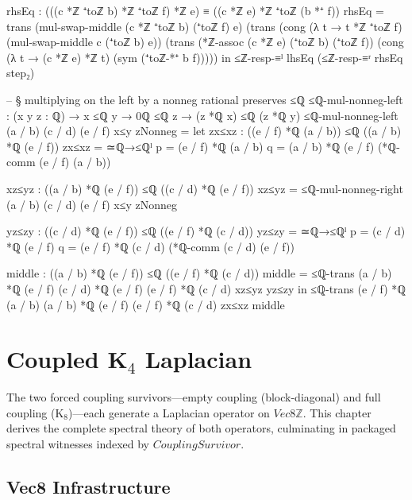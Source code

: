 \documentclass[11pt,a4paper]{book}
\def\texttt#1{#1}%
\begin{document}
\begin{code}
    rhsEq : (((c *ℤ ⁺toℤ b) *ℤ ⁺toℤ f) *ℤ e) ≡ ((c *ℤ e) *ℤ ⁺toℤ (b *⁺ f))
    rhsEq =
      trans
        (mul-swap-middle (c *ℤ ⁺toℤ b) (⁺toℤ f) e)
        (trans
          (cong (λ t → t *ℤ ⁺toℤ f) (mul-swap-middle c (⁺toℤ b) e))
          (trans
            (*ℤ-assoc (c *ℤ e) (⁺toℤ b) (⁺toℤ f))
            (cong (λ t → (c *ℤ e) *ℤ t) (sym (⁺toℤ-*⁺ b f)))))
  in
  ≤ℤ-resp-≡ˡ lhsEq (≤ℤ-resp-≡ʳ rhsEq step₂)

-- § multiplying on the left by a nonneg rational preserves ≤ℚ
≤ℚ-mul-nonneg-left : (x y z : ℚ) → x ≤ℚ y → 0ℚ ≤ℚ z → (z *ℚ x) ≤ℚ (z *ℚ y)
≤ℚ-mul-nonneg-left (a / b) (c / d) (e / f) x≤y zNonneg =
  let
    zx≤xz : ((e / f) *ℚ (a / b)) ≤ℚ ((a / b) *ℚ (e / f))
    zx≤xz =
      ≃ℚ→≤ℚˡ
        {p = (e / f) *ℚ (a / b)}
        {q = (a / b) *ℚ (e / f)}
        (*ℚ-comm (e / f) (a / b))

    xz≤yz : ((a / b) *ℚ (e / f)) ≤ℚ ((c / d) *ℚ (e / f))
    xz≤yz = ≤ℚ-mul-nonneg-right (a / b) (c / d) (e / f) x≤y zNonneg

    yz≤zy : ((c / d) *ℚ (e / f)) ≤ℚ ((e / f) *ℚ (c / d))
    yz≤zy =
      ≃ℚ→≤ℚˡ
        {p = (c / d) *ℚ (e / f)}
        {q = (e / f) *ℚ (c / d)}
        (*ℚ-comm (c / d) (e / f))

    middle : ((a / b) *ℚ (e / f)) ≤ℚ ((e / f) *ℚ (c / d))
    middle = ≤ℚ-trans {(a / b) *ℚ (e / f)} {(c / d) *ℚ (e / f)} {(e / f) *ℚ (c / d)} xz≤yz yz≤zy
  in
  ≤ℚ-trans {(e / f) *ℚ (a / b)} {(a / b) *ℚ (e / f)} {(e / f) *ℚ (c / d)} zx≤xz middle
\end{code}


\chapter{Coupled K$_4$ Laplacian}
\label{ch:coupled-k4-laplacian}

The two forced coupling survivors---empty coupling (block-diagonal) and full
coupling (K$_8$)---each generate a Laplacian operator on $\texttt{Vec8ℤ}$.
This chapter derives the complete spectral theory of both operators,
culminating in packaged spectral witnesses indexed by $\texttt{CouplingSurvivor}$.

\section{Vec8 Infrastructure}
\end{document}
